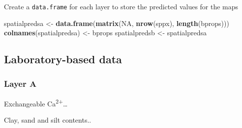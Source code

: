 \documentclass[]{book}
\newenvironment{Shaded}{\begin{snugshade}}{\end{snugshade}}
\newcommand{\DataTypeTok}[1]{\textcolor[rgb]{0.13,0.29,0.53}{#1}}
\newcommand{\KeywordTok}[1]{\textcolor[rgb]{0.13,0.29,0.53}{\textbf{#1}}}
\newcommand{\NormalTok}[1]{#1}
\newcommand{\OperatorTok}[1]{\textcolor[rgb]{0.81,0.36,0.00}{\textbf{#1}}}
\newcommand{\OtherTok}[1]{\textcolor[rgb]{0.56,0.35,0.01}{#1}}
\newcommand{\StringTok}[1]{\textcolor[rgb]{0.31,0.60,0.02}{#1}}
\begin{document}
Create a \texttt{data.frame} for each layer to store the predicted values for the maps

\begin{Shaded}
\begin{Highlighting}[]
\NormalTok{spatialpredsa <-}\StringTok{ }\KeywordTok{data.frame}\NormalTok{(}\KeywordTok{matrix}\NormalTok{(}\OtherTok{NA}\NormalTok{, }\KeywordTok{nrow}\NormalTok{(sppx), }\KeywordTok{length}\NormalTok{(bprops)))}
\KeywordTok{colnames}\NormalTok{(spatialpredsa) <-}\StringTok{ }\NormalTok{bprops}
\NormalTok{spatialpredsb <-}\StringTok{ }\NormalTok{spatialpredsa}
\end{Highlighting}
\end{Shaded}

\hypertarget{laboratory-based-data-2}{%
\subsection{Laboratory-based data}\label{laboratory-based-data-2}}

\hypertarget{layer-a-3}{%
\subsubsection{Layer A}\label{layer-a-3}}

Exchangeable Ca\textsuperscript{2+}\ldots{}

\begin{Shaded}
\end{Shaded}

Clay, sand and silt contents..
\end{document}

